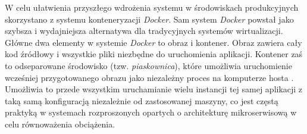 
W celu ułatwienia przyszłego wdrożenia systemu w środowiskach produkcyjnych skorzystano z systemu konteneryzacji
\textit{Docker}. Sam system \textit{Docker} powstał jako szybsza i wydajniejsza alternatywa dla tradycyjnych systemów
wirtualizacji. Główne dwa elementy w systemie \textit{Docker} to obraz i kontener. Obraz zawiera cały kod źródłowy i
wszystkie pliki niezbędne do uruchomienia aplikacji. Kontener zaś to odseparowane środowisko (tzw.
\textit{piaskownica}), które umożliwia uruchomienie wcześniej przygotowanego obrazu jako niezależny proces na komputerze
hosta \cite{bib:docker-overview}. Umożliwia to przede wszystkim uruchamianie wielu instancji tej samej aplikacji z taką
samą konfiguracją niezależnie od zastosowanej maszyny, co jest częstą praktyką w systemach rozproszonych opartych o
architekturę mikroserwisową w celu równoważenia obciążenia.
